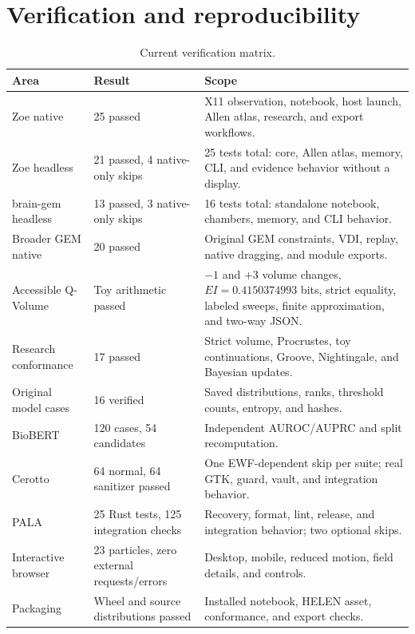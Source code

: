\documentclass[11pt,a4paper]{article}
\begin{document}
\section{Verification and reproducibility}
\begin{table}[htbp]
\centering
\caption{Current verification matrix.}
\small
\begin{tabular}{p{4.2cm}p{3cm}p{7cm}}
\toprule
Area & Result & Scope \\
\midrule
Zoe native & 25 passed & X11 observation, notebook, host launch, Allen atlas, research, and export workflows. \\
Zoe headless & 21 passed, 4 native-only skips & 25 tests total: core, Allen atlas, memory, CLI, and evidence behavior without a display. \\
brain-gem headless & 13 passed, 3 native-only skips & 16 tests total: standalone notebook, chambers, memory, and CLI behavior. \\
Broader GEM native & 20 passed & Original GEM constraints, VDI, replay, native dragging, and module exports. \\
Accessible Q-Volume & Toy arithmetic passed & $-1$ and $+3$ volume changes, $EI=0.4150374993$ bits, strict equality, labeled sweeps, finite approximation, and two-way JSON. \\
Research conformance & 17 passed & Strict volume, Procrustes, toy continuations, Groove, Nightingale, and Bayesian updates. \\
Original model cases & 16 verified & Saved distributions, ranks, threshold counts, entropy, and hashes. \\
BioBERT & 120 cases, 54 candidates & Independent AUROC/AUPRC and split recomputation. \\
Cerotto & 64 normal, 64 sanitizer passed & One EWF-dependent skip per suite; real GTK, guard, vault, and integration behavior. \\
PALA & 25 Rust tests, 125 integration checks & Recovery, format, lint, release, and integration behavior; two optional skips. \\
Interactive browser & 23 particles, zero external requests/errors & Desktop, mobile, reduced motion, field details, and controls. \\
Packaging & Wheel and source distributions passed & Installed notebook, HELEN asset, conformance, and export checks. \\
\bottomrule
\end{tabular}
\end{table}
\end{document}
